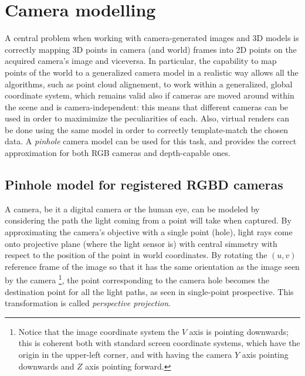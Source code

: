 \section{Camera modelling} \label{sec:camera_modelling}
A central problem when working with camera-generated images and 3D models is
correctly mapping 3D points in camera (and world) frames into 2D points on the
acquired camera's image and viceversa. In particular, the capability to map
points of the world to a generalized camera model in a realistic way allows all
the algorithms, such as point cloud alignement, to work within a generalized,
global coordinate system, which remains valid also if cameras are moved around
within the scene and is camera-independent: this means that different cameras
can be used in order to maximimize the peculiarities of each. Also, virtual
renders can be done using the same model in order to correctly template-match
the chosen data.  A \emph{pinhole} camera model can be used for this task, and
provides the correct approximation for both RGB cameras and depth-capable ones.

\subsection{Pinhole model for registered RGBD cameras}\label{sec:intrinsics}
A camera, be it a digital camera or the human eye, can be modeled by
considering the path the light coming from a point will take when
captured. By approximating the camera's objective with a single point (hole),
light rays come onto projective plane (where the light sensor is) with central
simmetry with respect to the position of the point in world coordinates. By
rotating the $(u,v)$ reference frame of the image so that it has the same
orientation as the image seen by the camera \footnote{Notice that the image
  coordinate system the $V$ axis is pointing downwards; this is coherent both
  with standard screen coordinate systems, which have the origin in the
  upper-left corner, and with having the camera $Y$ axis pointing downwards and
$Z$ axis pointing forward.}, the point corresponding to the camera hole
becomes the destination point for all the light paths, as seen in single-point
prospective. This transformation is called \emph{perspective projection}.

